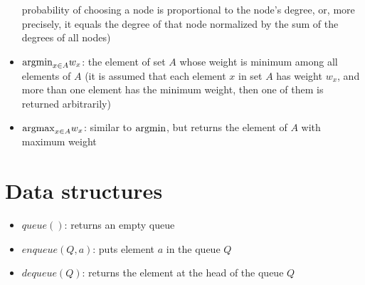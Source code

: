 \documentclass[10pt]{article}
\begin{document}
\begin{itemize}
 probability of choosing a node is proportional to the node's degree, or, more precisely, it equals the degree of that node normalized 
 by the sum of the degrees of all nodes)
\item {\color{blue} ${\rm argmin}_{x \in A} w_x$}: the element of set $A$ whose weight is minimum among all elements of $A$ (it is assumed that each element $x$ in set $A$ has weight $w_x$, and more than one element has the minimum weight, then one of them is returned arbitrarily)
\item {\color{blue} ${\rm argmax}_{x \in A} w_x$}: similar to ${\rm argmin}$, but returns the element of $A$ with maximum weight
\end{itemize}

\section{Data structures}
\begin{itemize}
\item $queue()$: returns an empty queue
\item $enqueue(Q,a)$: puts element $a$ in the queue $Q$
\item $dequeue(Q)$: returns the element at the head of the queue $Q$
\end{itemize}
\end{document}
